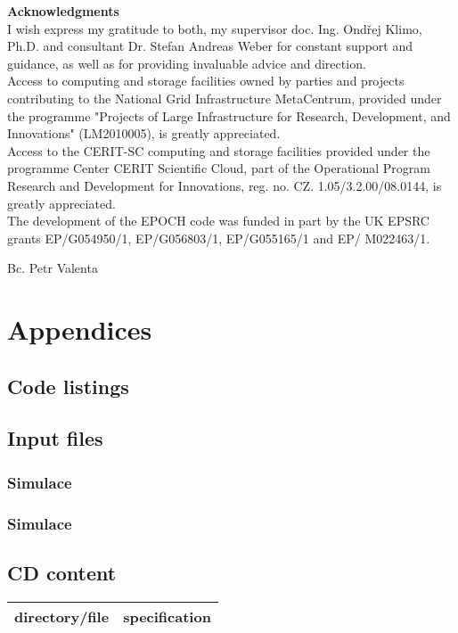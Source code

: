 \documentclass[12pt, twoside, a4paper, openright]{report}
\newcommand{\valenta}{Bc. Petr Valenta }
\newcommand{\klimo}{doc. Ing. Ondřej Klimo, Ph.D. }
\newcommand{\weber}{Dr. Stefan Andreas Weber }
\begin{document}
\newpage
\pagestyle{plain}
\null
\vfill
{\bf \noindent Acknowledgments} \\

I wish express my gratitude to both, my supervisor \klimo and consultant \weber for constant support and guidance, as well as for providing invaluable advice and direction.\\

Access to computing and storage facilities owned by parties and projects contributing to the National Grid Infrastructure MetaCentrum, provided under the programme "Projects of Large Infrastructure for Research, Development, and Innovations" (LM2010005), is greatly appreciated.\\

Access to the CERIT-SC computing and storage facilities provided under the programme Center CERIT Scientific Cloud, part of the Operational Program Research and Development for Innovations, reg. no. CZ. 1.05/3.2.00/08.0144, is greatly  appreciated.\\

The development of the EPOCH code was funded in part by the UK EPSRC grants EP/G054950/1, EP/G056803/1, EP/G055165/1 and EP/ M022463/1.\\
\begin{flushright}
\valenta
\end{flushright}


\newpage
{}




\part*{Appendices}

\appendix

\chapter{Code listings}


\chapter{Input files}

\section{Simulace}

\section{Simulace}

\chapter{CD content}
\centering
{\renewcommand{\arraystretch}{1.4}
	\begin{tabular}{ll}
		\hline \textbf{directory/file} & \textbf{specification} \\
		\hline
		\hline
	\end{tabular}
}
\end{document}
